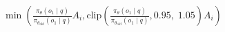 \documentclass[preview]{standalone}
\begin{document}
\begin{align*}
\min \left(\frac{\pi_\theta(o_1 \mid q)}{\pi_{\theta_{\text{old}}}(o_1 \mid q)} A_i, \text{clip} \left( \frac{\pi_\theta(o_1 \mid q)}{\pi_{\theta_{\text{old}}}(o_1 \mid q)}, 0.95,\; 1.05 \right) A_i \right)
\end{align*}
\end{document}
